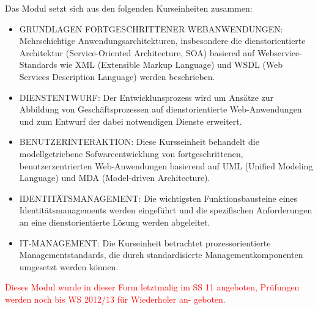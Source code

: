 \begin{module}
\begin{content}
Das Modul setzt sich aus den folgenden Kurseinheiten zusammen:

 \begin{itemize}\item GRUNDLAGEN FORTGESCHRITTENER WEBANWENDUNGEN: Mehrschichtige Anwendungsarchitekturen, insbesondere die dienstorientierte Architektur (Service-Oriented Architecture, SOA) basiered auf Webservice-Standards wie XML (Extensible Markup Language) und WSDL (Web Services Description Language) werden beschrieben.   \item DIENSTENTWURF: Der Entwicklunsprozess wird um Ansätze zur Abbildung von Geschäftsprozessen auf dienstorientierte Web-Anwendungen und zum Entwurf der dabei notwendigen Dienste erweitert.  \item BENUTZERINTERAKTION: Diese Kursseinheit behandelt die modellgetriebene Sofwareentwicklung von fortgeschrittenen, benutzerzentrierten Web-Anwendungen basierend auf UML (Unified Modeling Language) und MDA (Model-driven Architecture).   \item IDENTITÄTSMANAGEMENT: Die wichtigsten Funktionsbausteine eines Identitätsmanagements werden eingeführt und die spezifischen Anforderungen an eine dienstorientierte Lösung werden abgeleitet.  \item IT-MANAGEMENT: Die Kurseinheit betrachtet prozessorientierte Managementstandards, die durch standardisierte Managementkomponenten umgesetzt werden können.  \end{itemize}
\end{content}

\begin{remarks}\textcolor{red}{Dieses Modul wurde in dieser Form letztmalig im SS 11 angeboten, Prüfungen werden noch bis WS 2012/13 für Wiederholer an- \newline
geboten.}

\end{remarks}

\end{module}

